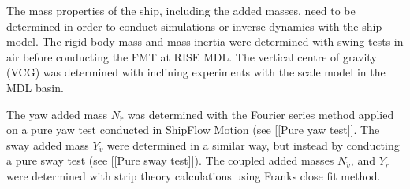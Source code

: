 The mass properties of the ship, including the added masses, need to be determined in order to conduct simulations or inverse dynamics with the ship model. The rigid body mass and mass inertia were determined with swing tests in air before conducting the FMT at RISE MDL. The vertical centre of gravity (VCG) was determined with inclining experiments with the scale model in the MDL basin.

The yaw added mass $N_{\dot{r}}$ was determined with the Fourier series method \citep{sakamotoURANSSimulationsStatic2012} applied on a pure yaw test conducted in ShipFlow Motion (see [[Pure yaw test]]. 
The sway added mass $Y_{\dot{v}}$ were determined in a similar way, but instead by conducting a pure sway test (see [[Pure sway test]]). The coupled added masses $N_{\dot{v}}$, and $Y_{\dot{r}}$ were determined with strip theory calculations using Franks close fit method.